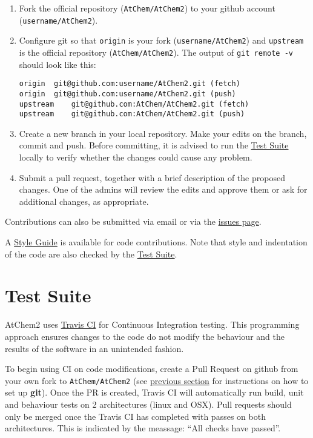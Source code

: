 \begin{enumerate}
\item Fork the official repository (\texttt{AtChem/AtChem2}) to your
  github account (\texttt{username/AtChem2}).
\item Configure git so that \texttt{origin} is your fork
  (\texttt{username/AtChem2}) and \texttt{upstream} is the official
  repository (\texttt{AtChem/AtChem2}). The output of \texttt{git\
    remote\ -v} should look like this:

\begin{verbatim}
origin  git@github.com:username/AtChem2.git (fetch)
origin  git@github.com:username/AtChem2.git (push)
upstream    git@github.com:AtChem/AtChem2.git (fetch)
upstream    git@github.com:AtChem/AtChem2.git (push)
\end{verbatim}

\item Create a new branch in your local repository. Make your edits on
  the branch, commit and push. Before committing, it is advised to run
  the \hyperref[sec:testsuite]{Test Suite} locally to verify whether
  the changes could cause any problem.
\item Submit a pull request, together with a brief description of the
  proposed changes. One of the admins will review the edits and
  approve them or ask for additional changes, as appropriate.
\end{enumerate}

Contributions can also be submitted via email or via the
\href{https://github.com/AtChem/AtChem2/issues}{issues page}.

A \hyperref[sec:style]{Style Guide} is available for code
contributions. Note that style and indentation of the code are also
checked by the \hyperref[sec:testsuite]{Test Suite}.

\section{Test Suite} \label{sec:testsuite}

AtChem2 uses \href{https://travis-ci.org/}{Travis CI} for Continuous
Integration testing. This programming approach ensures changes to the
code do not modify the behaviour and the results of the software in an
unintended fashion.

To begin using CI on code modifications, create a Pull Request on
github from your own fork to \texttt{AtChem/AtChem2} (see
\hyperref[sec:versions]{previous section} for instructions on how to
set up \textbf{git}). Once the PR is created, Travis CI will
automatically run build, unit and behaviour tests on 2 architectures
(linux and OSX). Pull requests should only be merged once the Travis
CI has completed with passes on both architectures. This is indicated
by the meassage: ``All checks have passed''.

